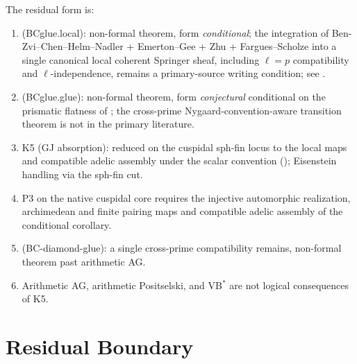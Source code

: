 \begin{remark}
\label{v4-arith:bcglue-k5:rem:residual-summary}
The residual form is:
\begin{enumerate}
\item (BCglue.local): non-formal theorem, form \emph{conditional}; the
integration of Ben-Zvi--Chen--Helm--Nadler + Emerton--Gee + Zhu +
Fargues--Scholze into a single canonical local coherent Springer sheaf,
including \(\ell=p\) compatibility and \(\ell\)-independence, remains a
primary-source writing condition; see
.
\item (BCglue.glue): non-formal theorem, form \emph{conjectural} conditional
on the prismatic flatness of
; the cross-prime
Nygaard-convention-aware transition theorem is not in the primary
literature.
\item K5 (GJ absorption): reduced on the cuspidal sph-fin locus to
the local maps and compatible adelic assembly under the scalar convention
(); Eisenstein
handling via the sph-fin cut.
\item P3 on the native cuspidal core requires the injective
automorphic realization, archimedean and finite pairing maps and
compatible adelic assembly of the conditional corollary.
\item (BC-diamond-glue): a single cross-prime compatibility remains,
non-formal theorem past arithmetic AG.
\item Arithmetic AG, arithmetic Positselski, and VB\(^{*}\) are not
logical consequences of K5.
\end{enumerate}
\end{remark}

\section{Residual Boundary}
\label{v4-arith:bcglue-k5:summary}

